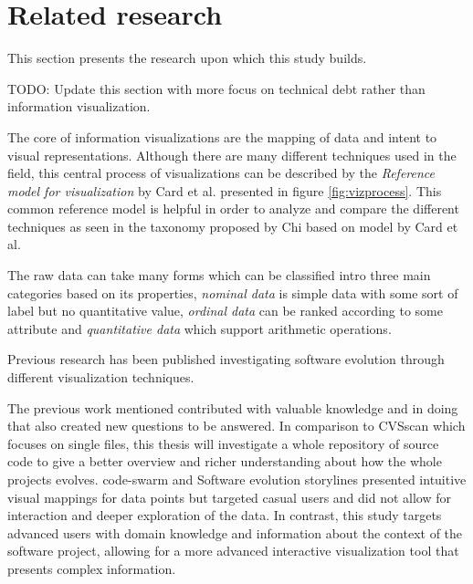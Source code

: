 

\section{Related research}

This section presents the research upon which this study builds.

TODO: Update this section with more focus on technical debt rather than information visualization.

The core of information visualizations are the mapping of data and intent to visual representations.
Although there are many different techniques used in the field, this central process of visualizations can be described by the \textit{Reference model for visualization} by Card et al. presented in figure \ref{fig:vizprocess}. \cite{card_readings_1999} 
This common reference model is helpful in order to analyze and compare the different techniques as seen in the taxonomy proposed by Chi based on model by Card et al. \cite{chi_taxonomy_2000}



The raw data can take many forms which can be classified intro three main categories based on its properties, \textit{nominal data} is simple data with some sort of label but no quantitative value, \textit{ordinal data} can be ranked according to some attribute and \textit{quantitative data} which support arithmetic operations. \cite{card_structure_1997}

Previous research has been published investigating software evolution through different visualization techniques. 

The previous work mentioned contributed with valuable knowledge and in doing that also created new questions to be answered.
In comparison to CVSscan which focuses on single files, this thesis will investigate a whole repository of source code to give a better overview and richer understanding about how the whole projects evolves.
code-swarm and Software evolution storylines presented intuitive visual mappings for data points but targeted casual users and did not allow for interaction and deeper exploration of the data.
In contrast, this study targets advanced users with domain knowledge and information about the context of the software project, allowing for a more advanced interactive visualization tool that presents complex information.
